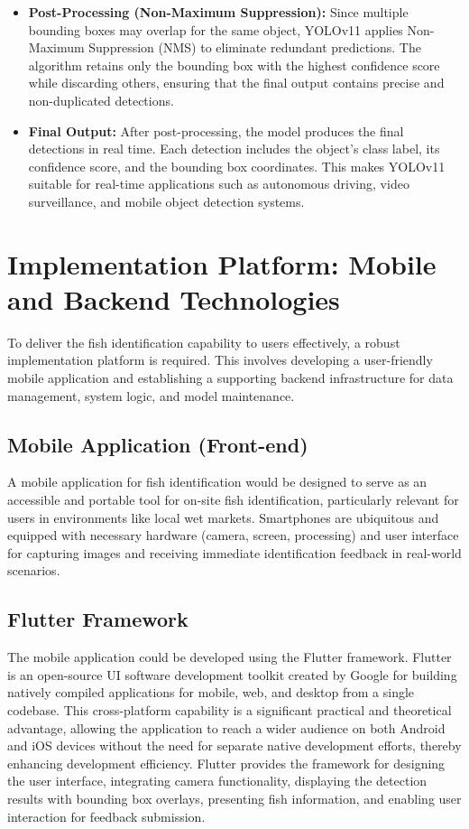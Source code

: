 \begin{itemize}
\item\textbf{Post-Processing (Non-Maximum Suppression):} Since multiple bounding boxes may overlap for the same object, YOLOv11 applies Non-Maximum Suppression (NMS) to eliminate redundant predictions. The algorithm retains only the bounding box with the highest confidence score while discarding others, ensuring that the final output contains precise and non-duplicated detections.

\item\textbf{Final Output:} After post-processing, the model produces the final detections in real time. Each detection includes the object’s class label, its confidence score, and the bounding box coordinates. This makes YOLOv11 suitable for real-time applications such as autonomous driving, video surveillance, and mobile object detection systems.
\end{itemize}



\section{Implementation Platform: Mobile and Backend Technologies}
To deliver the fish identification capability to users effectively, a robust implementation platform is required.
This involves developing a user-friendly mobile application and establishing a supporting backend infrastructure for data management, system logic, and model maintenance.

\subsection{Mobile Application (Front-end)}
A mobile application for fish identification would be designed to serve as an accessible and portable tool for
on-site fish identification, particularly relevant for users in environments like local wet markets. Smartphones
are ubiquitous and equipped with necessary hardware (camera, screen, processing) and user interface for
capturing images and receiving immediate identification feedback in real-world scenarios.


\subsection{Flutter Framework}
The mobile application could be developed using the Flutter framework. Flutter is an open-source UI
software development toolkit created by Google for building natively compiled applications for mobile, web,
and desktop from a single codebase. This cross-platform capability is a significant practical and theoretical
advantage, allowing the application to reach a wider audience on both Android and iOS devices without
the need for separate native development efforts, thereby enhancing development efficiency. Flutter provides
the framework for designing the user interface, integrating camera functionality, displaying the detection
results with bounding box overlays, presenting fish information, and enabling user interaction for feedback
submission.


